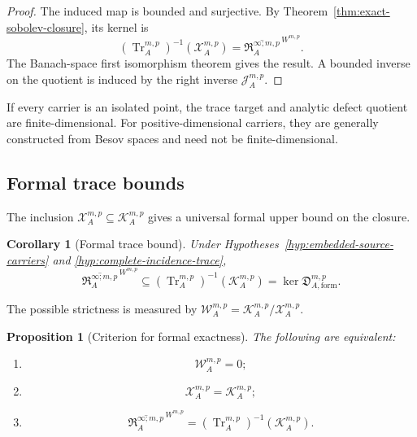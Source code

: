 \documentclass[11pt]{article}
\theoremstyle{plain}
\newtheorem{proposition}[theorem]{Proposition}
\newtheorem{corollary}[theorem]{Corollary}
\theoremstyle{definition}
\begin{document}
\begin{proof}
The induced map is bounded and surjective. By
Theorem~\ref{thm:exact-sobolev-closure},
its kernel is
\[
  \left(
    \operatorname{Tr}_A^{m,p}
  \right)^{-1}
  \left(
    \mathcal X_A^{m,p}
  \right)
  =
  \overline{
    \mathfrak R_A^{\infty;m,p}
  }^{\,W^{m,p}}.
\]
The Banach-space first isomorphism theorem gives the result. A bounded
inverse on the quotient is induced by the right inverse
\(\mathcal J_A^{m,p}\).
\end{proof}

If every carrier is an isolated point, the trace target and analytic
defect quotient are finite-dimensional. For positive-dimensional
carriers, they are generally constructed from Besov spaces and need
not be finite-dimensional.

\subsection{Formal trace bounds}
\label{subsec:formal-trace-bounds}

The inclusion \(\mathcal X_A^{m,p} \subseteq \mathcal K_A^{m,p}\) gives a universal formal upper bound on the closure.

\begin{corollary}[Formal trace bound]
\label{cor:formal-trace-bound}
Under
Hypotheses~\ref{hyp:embedded-source-carriers}
and \ref{hyp:complete-incidence-trace},
\[
  \overline{
    \mathfrak R_A^{\infty;m,p}
  }^{\,W^{m,p}}
  \subseteq
  \left(
    \operatorname{Tr}_A^{m,p}
  \right)^{-1}
  \left(
    \mathcal K_A^{m,p}
  \right)
  =
  \ker
  \mathfrak D_{A,\mathrm{form}}^{m,p}.
\]
\end{corollary}

The possible strictness is measured by
\(\mathcal W_A^{m,p} = \mathcal K_A^{m,p}/\mathcal X_A^{m,p}\).

\begin{proposition}[Criterion for formal exactness]
\label{prop:criterion-formal-exactness}
The following are equivalent:

\begin{enumerate}[label=\textup{(\roman*)}]
  \item
        \[
          \mathcal W_A^{m,p}=0;
        \]

  \item
        \[
          \mathcal X_A^{m,p}
          =
          \mathcal K_A^{m,p};
        \]

  \item
        \[
          \overline{
            \mathfrak R_A^{\infty;m,p}
          }^{\,W^{m,p}}
          =
          \left(
            \operatorname{Tr}_A^{m,p}
          \right)^{-1}
          \left(
            \mathcal K_A^{m,p}
          \right).
        \]
\end{enumerate}
\end{proposition}
\end{document}
